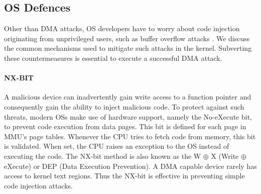 
        



\subsection{OS Defences}

Other than DMA attacks, OS developers have to worry about code injection originating from unprivileged users, such as buffer overflow attacks \cite{nx, kalsr}.
We discuss the common mechanisms used to mitigate such attacks in the kernel. Subverting these countermeasures is essential to execute a successful DMA attack.

\paragraph{NX-BIT}\label{sec:nx-bit}

A malicious device can inadvertently gain write access to a function pointer and consequently gain the ability to inject malicious code. 
To protect against such threats, modern OSs make use of hardware support, namely the No-eXecute bit, to prevent code execution from data pages. This bit is defined for each page in MMU’s page tables. Whenever the CPU tries to fetch code from memory, this bit is validated. When set, the CPU raises an exception to the OS instead of executing the code. The NX-bit method is also known as the W $\oplus$ X (Write $\oplus$ eXecute) or DEP (Data Execution Prevention). 
A DMA capable device rarely has access to kernel text regions. Thus the NX-bit is effective in preventing simple code injection attacks.

